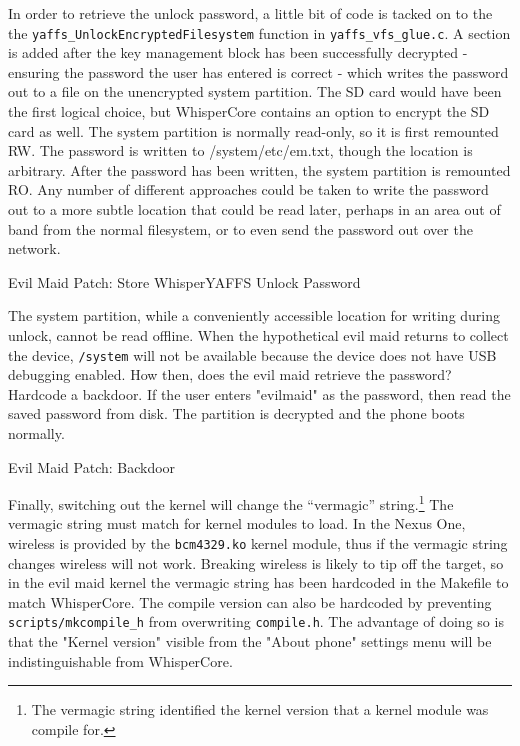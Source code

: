 In order to retrieve the unlock password, a little bit of code is tacked on to the the \texttt{yaffs\_UnlockEncryptedFilesystem} function in \texttt{yaffs\_vfs\_glue.c}. A section is added after the key management block has been successfully decrypted - ensuring the password the user has entered is correct - which writes the password out to a file on the unencrypted system partition. The SD card would have been the first logical choice, but WhisperCore contains an option to encrypt the SD card as well. The system partition is normally read-only, so it is first remounted RW. The password is written to /system/etc/em.txt, though the location is arbitrary. After the password has been written, the system partition is remounted RO. Any number of different approaches could be taken to write the password out to a more subtle location that could be read later, perhaps in an area out of band from the normal filesystem, or to even send the password out over the network. 

\begin{table}

\label{tab:storepass}
\caption{Evil Maid Patch: Store WhisperYAFFS Unlock Password}
\end{table}

The system partition, while a conveniently accessible location for writing during unlock, cannot be read offline.  When the
hypothetical evil maid returns to collect the device, \texttt{/system} will not be available because the device does not have USB
debugging enabled.  How then, does the evil maid retrieve the password? Hardcode a backdoor.  If the user enters "evilmaid" as the
password, then read the saved password from disk.  The partition is decrypted and the phone boots normally. 

\begin{table}

\label{tab:backdoor}
\caption{Evil Maid Patch: Backdoor}
\end{table}

Finally, switching out the kernel will change the ``vermagic'' string.\footnote{The vermagic string identified the kernel version
that a kernel module was compile for.} The vermagic string must match for kernel modules to load.  In the Nexus One, wireless is
provided by the \texttt{bcm4329.ko} kernel module, thus if the vermagic string changes wireless will not work.  Breaking wireless is likely
to tip off the target, so in the evil maid kernel the vermagic string has been hardcoded in the Makefile to match WhisperCore. 
The compile version can also be hardcoded by preventing \texttt{scripts/mkcompile\_h} from overwriting \texttt{compile.h}. 
The advantage of doing so is that the "Kernel version" visible from the "About phone" settings menu will be indistinguishable from WhisperCore.

